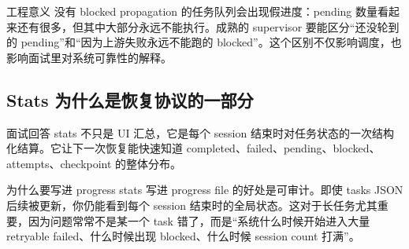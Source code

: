 \begin{analysisBox}{工程意义}
没有 blocked propagation 的任务队列会出现假进度：pending 数量看起来还有很多，但其中大部分永远不能执行。成熟的 supervisor 要能区分“还没轮到的 pending”和“因为上游失败永远不能跑的 blocked”。这个区别不仅影响调度，也影响面试里对系统可靠性的解释。
\end{analysisBox}

\subsection{Stats 为什么是恢复协议的一部分}
\begin{qaBox}{面试回答}
stats 不只是 UI 汇总，它是每个 session 结束时对任务状态的一次结构化结算。它让下一次恢复能快速知道 completed、failed、pending、blocked、attempts、checkpoint 的整体分布。
\end{qaBox}

\begin{analysisBox}{为什么要写进 progress}
stats 写进 progress file 的好处是可审计。即使 tasks JSON 后续被更新，你仍能看到每个 session 结束时的全局状态。这对于长任务尤其重要，因为问题常常不是某一个 task 错了，而是“系统什么时候开始进入大量 retryable failed、什么时候出现 blocked、什么时候 session count 打满”。
\end{analysisBox}

